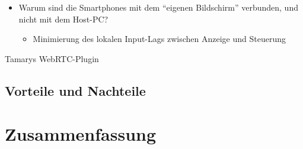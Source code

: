 \begin{itemize}
\tightlist
\item
  Warum sind die Smartphones mit dem ``eigenen Bildschirm'' verbunden,
  und nicht mit dem Host-PC?

  \begin{itemize}
  \tightlist
  \item
    Minimierung des lokalen Input-Lags zwischen Anzeige und Steuerung
  \end{itemize}
\end{itemize}

Tamarys WebRTC-Plugin

\subsection{Vorteile und Nachteile}\label{vorteile-und-nachteile-1}

\section{Zusammenfassung}\label{zusammenfassung}

\blindtext
